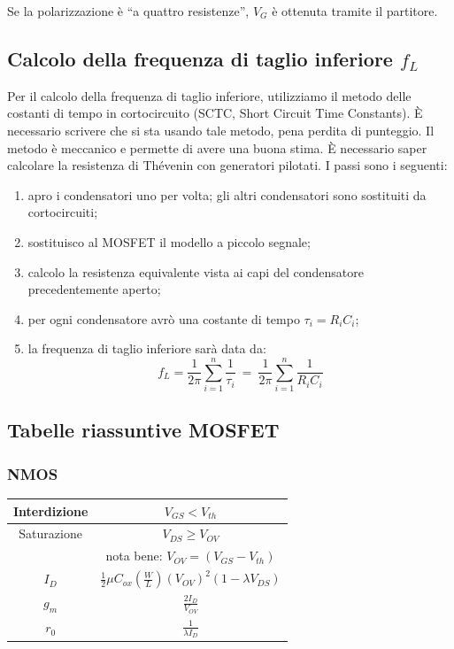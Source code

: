\documentclass[a4paper,twocolumn,notitlepage]{book}
\begin{document}
	Se la polarizzazione è ``a quattro resistenze'', $V_G$ è ottenuta tramite il partitore.
	
	\subsection*{Calcolo della frequenza di taglio inferiore $f_L$}
	Per il calcolo della frequenza di taglio inferiore, utilizziamo il metodo delle costanti di tempo in cortocircuito (SCTC, Short Circuit Time Constants). È necessario scrivere che si sta usando tale metodo, pena perdita di punteggio.\newline
	Il metodo è meccanico e permette di avere una buona stima. È necessario saper calcolare la resistenza di Thévenin con generatori pilotati. I passi sono i seguenti:
	\begin{enumerate}
		\item apro i condensatori uno per volta; gli altri condensatori sono sostituiti da cortocircuiti;
		\item sostituisco al MOSFET il modello a piccolo segnale;
		\item calcolo la resistenza equivalente vista ai capi del condensatore precedentemente aperto;
		\item per ogni condensatore avrò una costante di tempo $\tau_i=R_i C_i$;
		\item la frequenza di taglio inferiore sarà data da:
			\begin{equation}
				f_L=\frac{1}{2 \pi} \sum_{i=1}^n \frac{1}{\tau_i} \:=\: \frac{1}{2 \pi} \sum_{i=1}^n \frac{1}{R_i C_i}
			\end{equation}
	\end{enumerate}
	
	\subsection*{Tabelle riassuntive MOSFET}	
	\subsubsection*{NMOS}
		\begingroup
		\setlength{\tabcolsep}{5pt}
		\renewcommand{\arraystretch}{2.3}
		\begin{tabular}{|c|c|}
		\hline
		Interdizione & $V_{GS} < V_{th}$ \\
		\hline
		Saturazione & $V_{DS} \geq V_{OV}$\\
		& nota bene: $V_{OV}=(V_{GS}-V_{th})$\\
		\hline
		$I_D$ & $ \displaystyle \frac{1}{2} \mu C_{ox} \left( \frac{W}{L} \right) (V_{OV})^2 (1- \lambda V_{DS}) $\\
		\hline
		$g_m$ & $ \displaystyle \frac{2 I_D}{V_{OV}}$ \\
		\hline
		$r_0$ & $\displaystyle \frac{1}{\lambda I_D}$ \\
		\hline
		\end{tabular}
		\endgroup
\end{document}
